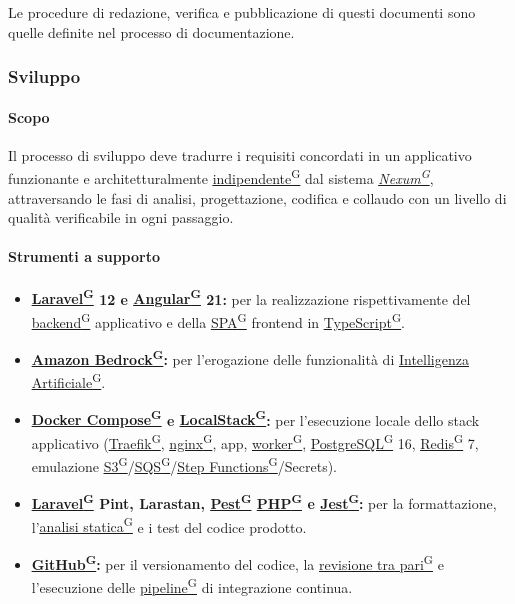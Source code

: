 \documentclass[a4paper,12pt]{article}
\providecommand{\glslink}[2]{\href{https://alittlebyte-19.github.io/Documentazione/glossario.html\#gls-#1}{\underline{#2}\textsuperscript{\scriptsize G}}}
\begin{document}
Le procedure di redazione, verifica e pubblicazione di questi documenti sono quelle definite nel processo di documentazione.

\subsubsection{Sviluppo}

\paragraph{Scopo}
Il processo di sviluppo deve tradurre i requisiti concordati in un applicativo funzionante e architetturalmente \glslink{standalone}{indipendente} dal sistema \textit{\glslink{nexum}{Nexum}}, attraversando le fasi di analisi, progettazione, codifica e collaudo con un livello di qualità verificabile in ogni passaggio.

\paragraph{Strumenti a supporto}
\begin{itemize}
    \item \textbf{\glslink{laravel}{Laravel} 12 e \glslink{angular}{Angular} 21:} per la realizzazione rispettivamente del \glslink{backend}{backend} applicativo e della \glslink{spa-single-page-application}{SPA} frontend in \glslink{typescript}{TypeScript}.
    \item \textbf{\glslink{amazon-bedrock}{Amazon Bedrock}:} per l'erogazione delle funzionalità di \glslink{intelligenza-artificiale-ai}{Intelligenza Artificiale}.
    \item \textbf{\glslink{docker-compose}{Docker Compose} e \glslink{localstack}{LocalStack}:} per l'esecuzione locale dello stack applicativo (\glslink{traefik}{Traefik}, \glslink{nginx}{nginx}, app, \glslink{worker}{worker}, \glslink{postgresql}{PostgreSQL} 16, \glslink{redis}{Redis} 7, emulazione \glslink{s3-simple-storage-service}{S3}/\glslink{sqs-simple-queue-service}{SQS}/\glslink{step-functions}{Step Functions}/Secrets).
    \item \textbf{\glslink{laravel}{Laravel} Pint, Larastan, \glslink{pest}{Pest} \glslink{php}{PHP} e \glslink{jest}{Jest}:} per la formattazione, l'\glslink{analisi-statica}{analisi statica} e i test del codice prodotto.
    \item \textbf{\glslink{github}{GitHub}:} per il versionamento del codice, la \glslink{code-review}{revisione tra pari} e l'esecuzione delle \glslink{workflow}{pipeline} di integrazione continua.
\end{itemize}
\end{document}
